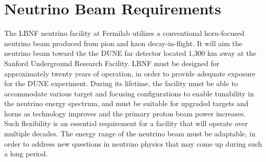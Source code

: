 \section{Neutrino Beam Requirements}
\label{sec:physics-lbnosc-beam-req}
The LBNF neutrino facility at Fermilab utilizes a conventional
horn-focused neutrino beam produced from pion and kaon decay-in-flight. It will
aim the neutrino beam toward the 
the DUNE far detector located 1,300 km away at the Sanford Underground
Research Facility. LBNF must be designed for approximately twenty years of operation, in order to provide adequate exposure for the DUNE experiment. During its lifetime, the facility must be able to accommodate various target and focusing configurations to enable tunability 
in the neutrino energy spectrum, and must be suitable for upgraded targets and horns as technology improves and the primary proton beam power increases. Such
flexibility is an essential requirement for a facility that will operate over multiple decades. The energy range of the neutrino beam must be adaptable, in order to address new questions in neutrino physics that may come up during such a long period.

